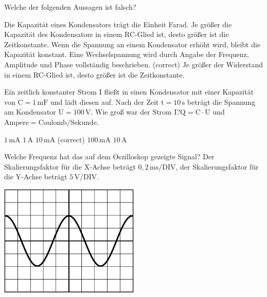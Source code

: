 \documentclass[11pt]{exam}
\begin{document}
\setlength{\voffset}{-0.5in}
\setlength{\headsep}{5pt}

\hspace{2mm}
 \hspace{5mm}
\vspace{4mm}

\begin{questions}

\question Welche der folgenden Aussagen ist falsch?

\begin{choices}
	\choice Die Kapazität eines Kondensators trägt die Einheit Farad.
	\choice Je größer die Kapazität des Kondensators in einem RC-Glied ist, desto größer ist die Zeitkonstante.
	\choice Wenn die Spannung an einem Kondensator erhöht wird, bleibt die Kapazität konstant.
	\choice Eine Wechselspannung wird durch Angabe der Frequenz, Amplitude und Phase vollständig beschrieben. (correct)
	\choice Je größer der Widerstand in einem RC-Glied ist, desto größer ist die Zeitkonstante.
\end{choices}

\vspace{3mm}\question Ein zeitlich konstanter Strom \(\mathrm{I}\) fließt in einen Kondensator mit einer Kapazität von \(\mathrm{C=1\,mF}\) und lädt diesen auf. Nach der Zeit \(\mathrm{t=10\,s}\) beträgt die Spannung am Kondensator \(\mathrm{U=100\,V}\). Wie groß war der Strom \(\mathrm{I}\)?\(\mathrm{Q=C \cdot U}\) und \(\mathrm{Ampere=Coulomb/Sekunde}\).

\begin{choices}
	\choice \(\mathrm{1\,mA}\)
	\choice \(\mathrm{1\,A}\)
	\choice \(\mathrm{10\,mA}\) (correct)
	\choice \(\mathrm{100\,mA}\)
	\choice \(\mathrm{10\,A}\)
\end{choices}

\vspace{3mm}\question Welche Frequenz hat das auf dem Oszilloskop gezeigte Signal? Der Skalierungsfaktor für die X-Achse beträgt \(\mathrm{0,2\,ms/DIV}\), der Skalierungsfaktor für die Y-Achse beträgt \(\mathrm{5\,V/DIV}\). 

\includegraphics[width=0.5\textwidth]{../../../questions/D/images/Oszi2.png}


\end{questions}
\end{document}
